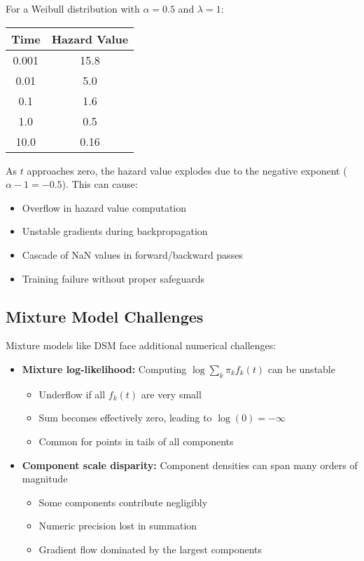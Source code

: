 \begin{examplebox}[title=Weibull Hazard Calculation Issues]
For a Weibull distribution with $\alpha = 0.5$ and $\lambda = 1$:
\begin{center}
    \begin{tabular}{|c|c|}
        \hline
        \textbf{Time} & \textbf{Hazard Value} \\
        \hline
        0.001 & 15.8 \\
        0.01 & 5.0 \\
        0.1 & 1.6 \\
        1.0 & 0.5 \\
        10.0 & 0.16 \\
        \hline
    \end{tabular}
\end{center}

As $t$ approaches zero, the hazard value explodes due to the negative exponent ($\alpha-1 = -0.5$). This can cause:
\begin{itemize}
    \item Overflow in hazard value computation
    \item Unstable gradients during backpropagation
    \item Cascade of NaN values in forward/backward passes
    \item Training failure without proper safeguards
\end{itemize}
\end{examplebox}

\subsection{Mixture Model Challenges}

Mixture models like DSM face additional numerical challenges:

\begin{itemize}
    \item \textbf{Mixture log-likelihood:} Computing $\log \sum_k \pi_k f_k(t)$ can be unstable
    \begin{itemize}
        \item Underflow if all $f_k(t)$ are very small
        \item Sum becomes effectively zero, leading to $\log(0) = -\infty$
        \item Common for points in tails of all components
    \end{itemize}

    \item \textbf{Component scale disparity:} Component densities can span many orders of magnitude
    \begin{itemize}
        \item Some components contribute negligibly
        \item Numeric precision lost in summation
        \item Gradient flow dominated by the largest components
    \end{itemize}
\end{itemize}

